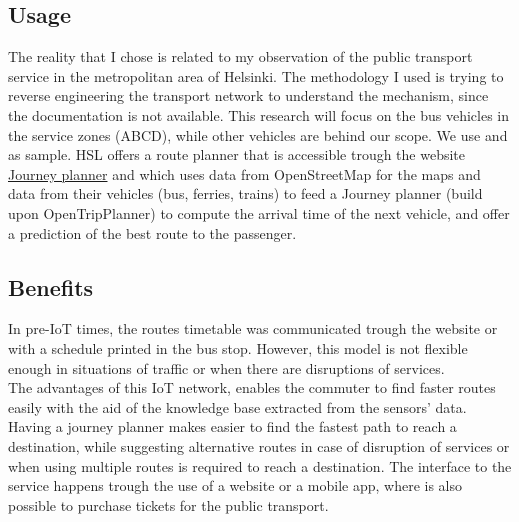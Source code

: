 \documentclass[a4paper, 12pt]{article}
\begin{document}
\subsection{Usage} %
\label{sub:usage}
The reality that I chose is related to my observation of the public transport
service in the metropolitan area of Helsinki. The methodology I used is trying
to reverse engineering the transport network to understand the mechanism, since
the documentation is not available. This research will focus
on the bus vehicles in the service zones (ABCD), while other vehicles are
behind our scope. 
We use \cite{6714496} and
\cite{8320780} as sample.
HSL offers a route planner that is accessible trough the website
\href{https://reittiopas.hsl.fi/etusivu}{Journey planner} and which uses data
from OpenStreetMap for the maps and data from their vehicles (bus, ferries,
trains) to feed a Journey planner (build upon OpenTripPlanner) to compute the
arrival time of the next vehicle, and offer a prediction of the best route to 
the passenger. 


\subsection{Benefits} %
\label{sub:benefits}
In pre-IoT times, the routes timetable was communicated trough the website or
with a schedule printed in the bus stop. However, this model is not flexible
enough in situations of traffic or when there are disruptions of services.\\
The advantages of this IoT network, enables the commuter to find faster routes
easily with the aid of the knowledge base extracted from the sensors' data. 
Having a journey planner makes easier to find the fastest path to reach a destination,
while suggesting alternative routes in case of disruption of services or when
using multiple routes is required to reach a destination. 
The interface to the service happens trough the use of a website or a mobile
app, where is also possible to purchase tickets for the public transport. 

\end{document}
